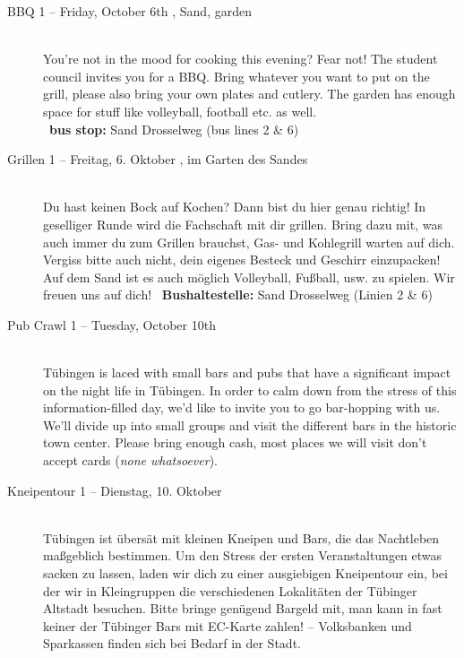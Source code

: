 \begin{description}
\ifml
	\item[BBQ 1 -- Friday, October 6th \YEAR, Sand, garden]~\\%
	You're not in the mood for cooking this evening? Fear not!
    The student council invites you for a BBQ. Bring whatever you want to put on the grill,
    please also bring your own plates and cutlery. The garden has enough space for stuff like volleyball, football etc. as well.\\
	~\textbf{bus stop:} Sand Drosselweg (bus lines 2 \& 6)
\else
	\item[Grillen 1 -- Freitag, 6. Oktober \YEAR, im Garten des Sandes]~\\%
	Du hast keinen Bock auf Kochen? Dann bist du hier genau richtig! In geselliger Runde wird die Fachschaft mit dir grillen.
	Bring dazu mit, was auch immer du zum Grillen brauchst, Gas- und Kohlegrill warten auf dich. Vergiss bitte auch nicht, dein eigenes Besteck und Geschirr einzupacken!\\
	Auf dem Sand ist es auch möglich Volleyball, Fußball, usw. zu spielen. Wir freuen uns auf dich!
	~\textbf{Bushaltestelle:} Sand Drosselweg (Linien 2 \& 6)
\fi

\ifml
	\item[Pub Crawl 1 -- Tuesday, October 10th \YEAR]~\\%
	Tübingen is laced with small bars and pubs that have a significant impact on the night life in Tübingen.
	In order to calm down from the stress of this information-filled day, we'd like to invite you to go bar-hopping with us.
	We'll divide up into small groups and visit the different bars in the historic town center.
	Please bring enough cash, most places we will visit don't accept cards (\emph{none whatsoever}).
\else
	\item[Kneipentour 1 -- Dienstag, 10. Oktober \YEAR]~\\%
	Tübingen ist übersät mit kleinen Kneipen und Bars, die das Nachtleben maßgeblich bestimmen.
	Um den Stress der ersten Veranstaltungen etwas sacken zu lassen, laden wir dich zu einer ausgiebigen Kneipentour ein,
	bei der wir in Kleingruppen die verschiedenen Lokalitäten der Tübinger Altstadt besuchen.
	Bitte bringe genügend Bargeld mit, man kann in fast keiner der Tübinger Bars mit EC-Karte zahlen! -- Volksbanken und Sparkassen finden sich bei Bedarf in der Stadt.
\fi


\end{description}
